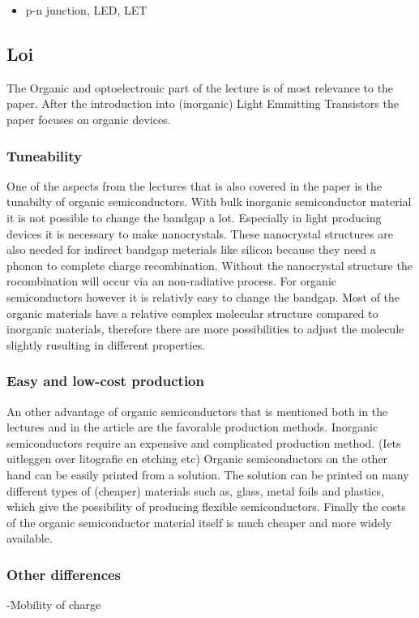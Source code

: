 \begin{itemize}
 \item p-n junction, LED, LET
\end{itemize}

\subsection{Loi}
The Organic and optoelectronic part of the lecture is of most relevance to the paper. After the introduction into (inorganic) Light Emmitting Transistors the paper focuses on organic devices. 

\subsubsection{Tuneability}
One of the aspects from the lectures that is also covered in the paper is the tunabilty of organic semiconductors. With bulk inorganic semiconductor material it is not possible to change the bandgap a lot. Especially in light producing devices it is necessary to make nanocrystals. These nanocrystal structures are also needed for indirect bandgap meterials like silicon because they need a phonon to complete charge recombination. Without the nanocrystal structure the rocombination will occur via an non-radiative process. For organic semiconductors however it is relativly easy to change the bandgap. Most of the organic materials have a relative complex molecular structure compared to inorganic materials, therefore there are more possibilities to adjust the molecule slightly rusulting in different properties. 
\subsubsection{Easy and low-cost production}
An other advantage of organic semiconductors that is mentioned both in the lectures and in the article are the favorable production methods. Inorganic semiconductors require an expensive and complicated production method. (Iets uitleggen over litografie en etching etc) Organic semiconductors on the other hand can be easily printed from a solution. The solution can be printed on many different types of (cheaper) materials such as, glass, metal foils and plastics, which give the possibility of producing flexible semiconductors. Finally the costs of the organic semiconductor material itself is much cheaper and more widely available.
\subsubsection{Other differences}
-Mobility of charge


